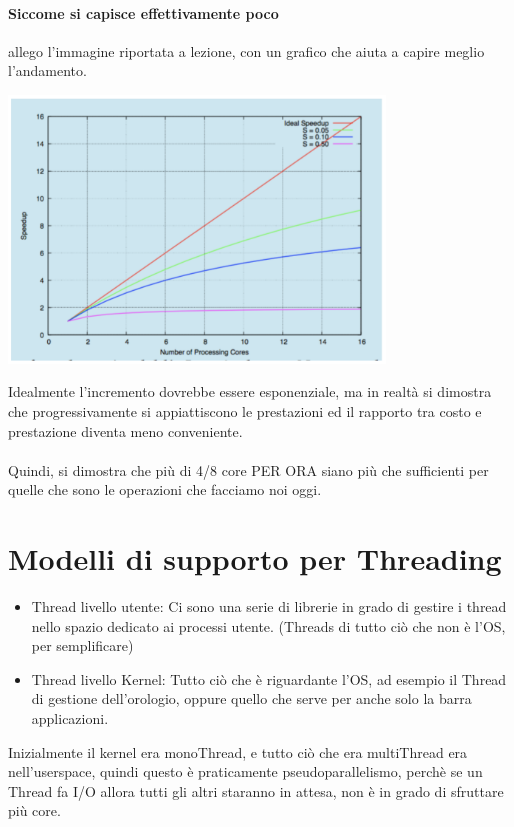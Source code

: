 \documentclass[12pt, a4paper, openany, twoside]{book}
\begin{document}
\paragraph{Siccome si capisce effettivamente poco} allego l'immagine riportata
a lezione, con un grafico che aiuta a capire meglio l'andamento.
\begin{center}
\includegraphics[width=0.75\textwidth]{ambdahl}
\end{center}
Idealmente l'incremento dovrebbe essere esponenziale, ma in realtà si dimostra
che progressivamente si appiattiscono le prestazioni ed il rapporto tra costo
e prestazione diventa meno conveniente.\\ \\
Quindi, si dimostra che più di 4/8 core PER ORA siano più che sufficienti per 
quelle che sono le operazioni che facciamo noi oggi.
\section{Modelli di supporto per Threading}
\begin{itemize}
	\item Thread livello utente:
	Ci sono una serie di librerie in grado di gestire i thread nello spazio 
	dedicato ai processi utente. (Threads di tutto ciò che non è l'OS, per 
	semplificare)
	\item Thread livello Kernel: Tutto ciò che è riguardante l'OS, ad esempio
	il Thread di gestione dell'orologio, oppure quello che serve per anche solo
	la barra applicazioni. \\
\end{itemize}
Inizialmente il kernel era monoThread, e tutto ciò che era multiThread era 
nell'userspace, quindi questo è praticamente pseudoparallelismo, perchè se un
Thread fa I/O allora tutti gli altri staranno in attesa, non è in grado di 
sfruttare più core.\\ \\
\end{document}

